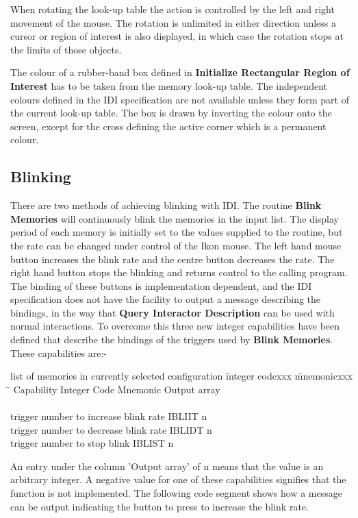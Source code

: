 When rotating the look-up table the action is controlled by the left
and right movement of the mouse. The rotation is unlimited in either
direction unless a cursor or region of interest is also displayed, in
which case the rotation stops at the limits of those objects.

The colour of a rubber-band box defined in {\bf Initialize Rectangular
Region of Interest} has to be taken from the memory look-up table. The
independent colours defined in the IDI specification are not available
unless they form part of the current look-up table. The box is drawn
by inverting the colour onto the screen, except for the cross defining
the active corner which is a permanent colour.

\subsection{Blinking}

There are two methods of achieving blinking with IDI.
The routine {\bf Blink Memories} will continuously blink the memories in
the input list. The display period of each memory is initially set to the
values supplied to the routine, but the rate can be changed under control
of the Ikon mouse. The left hand mouse button increases the blink rate and
the centre button decreases the rate. The right hand button stops the
blinking and returns control to the calling program.
The binding of these buttons is implementation dependent, and the IDI
specification does not have the facility to output a message describing the
bindings, in the way that {\bf Query Interactor Description} can be used
with normal interactions. To overcome this three new integer capabilities
have been defined that describe the bindings of the triggers used by
{\bf Blink Memories}. These capabilities are:-
\newpage
\begin{tabbing}
list of memories in currently selected configuration \= integer codexxx \= mnemonicxxx \= \kill
Capability \> Integer Code \> Mnemonic \> Output array \\
\\
trigger number to increase blink rate  \> IBLIIT \> n \\
trigger number to decrease blink rate  \> IBLIDT \> n \\
trigger number to stop blink  \> IBLIST \> n \\
\end{tabbing}
An entry under the column 'Output array' of n means that the value is an
arbitrary integer. A negative value for one of these capabilities signifies
that the function is not implemented. The following code segment shows how
a message can be output indicating the button to press to increase the
blink rate.

